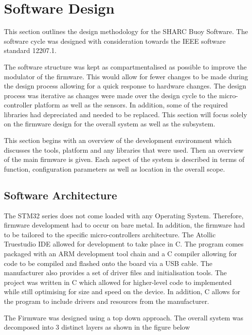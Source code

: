 \chapter{Software Design}
\label{sec:ch3_soft}
This section outlines the design methodology for the SHARC Buoy Software. The software cycle was designed with consideration towards the IEEE software standard 12207.1.


The software structure was kept as compartmentalised as possible to improve the modulator of the firmware. This would allow for fewer changes to be made during the design process allowing for a quick response to hardware changes. The design process was iterative as changes were made over the design cycle to the micro-controller platform as well as the sensors. In addition, some of the required libraries had depreciated and needed to be replaced.  This section will focus solely on the firmware design for the overall system as well as the subsystem. 

This section begins with an overview of the development environment which discusses the tools, platform and any libraries that were used. Then an overview of the main firmware is given. Each aspect of the system is described in terms of function, configuration parameters as well as location in the overall scope.

\section{Software Architecture}

The STM32 series does not come loaded with any Operating System. Therefore, firmware development had to occur on bare metal. In addition, the firmware had to be tailored to the specific micro-controllers architecture. The Atollic Truestudio IDE allowed for development to take place in C. The program comes packaged with an ARM development tool chain and a C compiler allowing for code to be compiled and flashed onto the board via a USB cable. The manufacturer also provides a set of driver files and  initialisation tools. The project was written in C which allowed for higher-level code to implemented while still optimising for size and speed on the device. In addition, C allows for the program to include drivers and resources from the manufacturer. \par 

The Firmware was designed using a top down approach. The overall system was decomposed into 3 distinct layers as shown in the figure below

